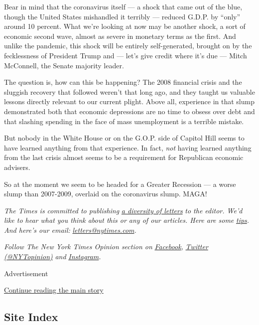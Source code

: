 Bear in mind that the coronavirus itself --- a shock that came out of
the blue, though the United States mishandled it terribly --- reduced
G.D.P. by ``only'' around 10 percent. What we're looking at now may be
another shock, a sort of economic second wave, almost as severe in
monetary terms as the first. And unlike the pandemic, this shock will be
entirely self-generated, brought on by the fecklessness of President
Trump and --- let's give credit where it's due --- Mitch McConnell, the
Senate majority leader.

The question is, how can this be happening? The 2008 financial crisis
and the sluggish recovery that followed weren't that long ago, and they
taught us valuable lessons directly relevant to our current plight.
Above all, experience in that slump demonstrated both that economic
depressions are no time to obsess over debt and that slashing spending
in the face of mass unemployment is a terrible mistake.

But nobody in the White House or on the G.O.P. side of Capitol Hill
seems to have learned anything from that experience. In fact, \emph{not}
having learned anything from the last crisis almost seems to be a
requirement for Republican economic advisers.

So at the moment we seem to be headed for a Greater Recession --- a
worse slump than 2007-2009, overlaid on the coronavirus slump. MAGA!

\emph{The Times is committed to publishing}
\href{https://www.nytimes.com/2019/01/31/opinion/letters/letters-to-editor-new-york-times-women.html}{\emph{a
diversity of letters}} \emph{to the editor. We'd like to hear what you
think about this or any of our articles. Here are some}
\href{https://help.nytimes.com/hc/en-us/articles/115014925288-How-to-submit-a-letter-to-the-editor}{\emph{tips}}\emph{.
And here's our email:}
\href{mailto:letters@nytimes.com}{\emph{letters@nytimes.com}}\emph{.}

\emph{Follow The New York Times Opinion section on}
\href{https://www.facebook.com/nytopinion}{\emph{Facebook}}\emph{,}
\href{http://twitter.com/NYTOpinion}{\emph{Twitter (@NYTopinion)}}
\emph{and}
\href{https://www.instagram.com/nytopinion/}{\emph{Instagram}}\emph{.}

Advertisement

\protect\hyperlink{after-bottom}{Continue reading the main story}

\hypertarget{site-index}{%
\subsection{Site Index}\label{site-index}}

